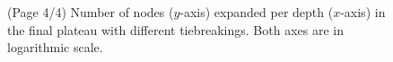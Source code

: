 \begin{figure}[htbp]
 \caption{(Page 4/4) Number of nodes ($y$-axis) expanded per depth ($x$-axis) in
 the final plateau with different tiebreakings. Both axes are in logarithmic scale.
 }
 \label{fig:depth-histogram4}
\end{figure}

